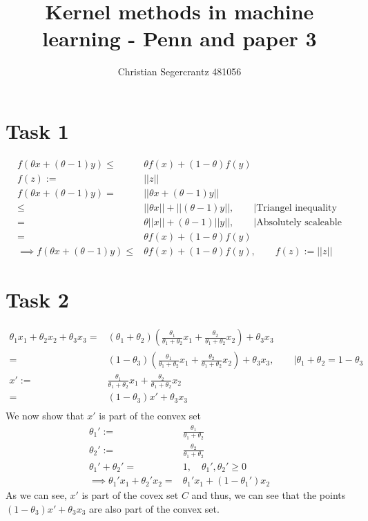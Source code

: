 \documentclass{article}
\title{Kernel methods in machine learning - Penn and paper 3}
\author{Christian Segercrantz 481056}
\begin{document}
	\maketitle
	\pagebreak
	\section*{Task 1}
	\begin{align}
		f(\theta x + (\theta - 1)y) \leq& \theta f(x) + (1-\theta) f(y) \\
		f(z) :=& ||z|| \\
		f(\theta x + (\theta - 1)y) =& ||\theta x + (\theta - 1)y|| \\
		\leq & ||\theta x || + ||(\theta - 1)y||, \qquad | \text{Triangel inequality} \\
		=& \theta ||x|| + (\theta -1)||y||, \qquad | \text{Absolutely scaleable} \\
		=& \theta f(x) + (1-\theta) f(y) \\
		\implies	f(\theta x + (\theta - 1)y) \leq& \theta f(x) + (1-\theta) f(y), \qquad f(z) := ||z||
	\end{align}
	
	\section*{Task 2}
	\begin{align}
		\theta_1 x_1 + \theta_2 x_2 + \theta_3 x_3 =& (\theta_1 + \theta_2)\left( \frac{\theta_1}{\theta_1 + \theta_2} x_1 + \frac{\theta_2}{\theta_1 + \theta_2} x_2\right)  + \theta_3 x_3  \\
		=& (1-\theta_3)\left( \frac{\theta_1}{\theta_1 + \theta_2} x_1 + \frac{\theta_2}{\theta_1 + \theta_2} x_2\right)  + \theta_3 x_3 , \qquad | \theta_1 + \theta_2 = 1 - \theta_3\\
		x' := &  \frac{\theta_1}{\theta_1 + \theta_2} x_1 + \frac{\theta_2}{\theta_1 + \theta_2} x_2 \\
		=& (1-\theta_3)x'  + \theta_3 x_3 \\
	\end{align}
	We now show that $x'$ is part of the convex set
	\begin{align}
		\theta_1' :=& \frac{\theta_1}{\theta_1 + \theta_2} \\ \theta_2' :=& \frac{\theta_2}{\theta_1 + \theta_2} \\
		\theta_1' + \theta_2' =& 1, \quad \theta_1', \theta_2' \geq 0 \\
		\implies \theta_1' x_1 + \theta_2'x_2 =& \theta_1' x_1 + (1-\theta_1')x_2
	\end{align}
	As we can see, $x'$ is part of the covex set $C$ and thus, we can see that the points $(1-\theta_3)x'  + \theta_3 x_3$ are also part of the convex set.
	
\end{document}
